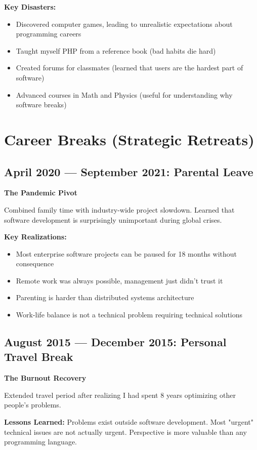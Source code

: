 \documentclass[10pt,a4paper]{article}
\begin{document}
\textbf{Key Disasters:}
\begin{itemize}[leftmargin=*,itemsep=1pt]
    \item Discovered computer games, leading to unrealistic expectations about programming careers
    \item Taught myself PHP from a reference book (bad habits die hard)
    \item Created forums for classmates (learned that users are the hardest part of software)
    \item Advanced courses in Math and Physics (useful for understanding why software breaks)
\end{itemize}

\section{Career Breaks (Strategic Retreats)}

\subsection{April 2020 — September 2021: Parental Leave}
\textbf{The Pandemic Pivot}

Combined family time with industry-wide project slowdown. Learned that software development is surprisingly unimportant during global crises.

\textbf{Key Realizations:}
\begin{itemize}[leftmargin=*,itemsep=1pt]
    \item Most enterprise software projects can be paused for 18 months without consequence
    \item Remote work was always possible, management just didn't trust it
    \item Parenting is harder than distributed systems architecture
    \item Work-life balance is not a technical problem requiring technical solutions
\end{itemize}

\subsection{August 2015 — December 2015: Personal Travel Break}
\textbf{The Burnout Recovery}

Extended travel period after realizing I had spent 8 years optimizing other people's problems.

\textbf{Lessons Learned:} Problems exist outside software development. Most "urgent" technical issues are not actually urgent. Perspective is more valuable than any programming language.
\end{document}
